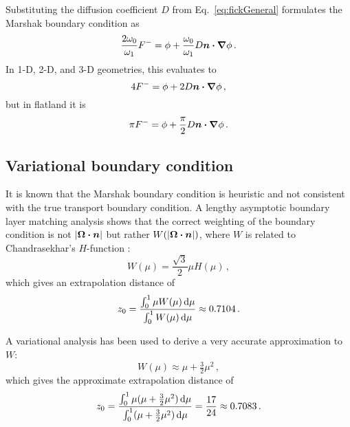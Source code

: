 Substituting the diffusion coefficient $D$ from Eq.~\eqref{eq:fickGeneral}
formulates the Marshak boundary condition as
\begin{equation*}
\frac{2\omega_0}{\omega_1} F^{-}
= \phi + \frac{\omega_0}{\omega_1} D \bm{n} \bm{\cdot} \bm{\nabla} \phi\,.
\end{equation*}
In 1-D, 2-D, and 3-D geometries, this evaluates to
\begin{equation*}
4 F^{-}
= \phi + 2 D \bm{n} \bm{\cdot} \bm{\nabla} \phi\,,
\end{equation*}
but in flatland it is
\begin{equation}\label{eq:flatlandDiffusionMarshak}
\pi F^{-}
= \phi + \frac{\pi}{2} D \bm{n} \bm{\cdot} \bm{\nabla} \phi\,.
\end{equation}

\subsection{Variational boundary condition} \label{sec:varBndy}
It is known that the Marshak boundary condition is heuristic and not consistent with the
true transport boundary condition. A lengthy asymptotic boundary layer
matching analysis \cite{Hab1975} shows that the correct weighting of the
boundary condition is not $\left| \bm{\Omega}\bm{\cdot}\bm{n} \right|$ but rather
$W(\left| \bm{\Omega}\bm{\cdot}\bm{n} \right|)$, where $W$ is related to Chandrasekhar's
$H$-function \cite{Cha1960}:
\begin{equation} \label{eq:chandraW}
  W(\mu) = \frac{\sqrt{3}}{2} \mu H(\mu) \,,
\end{equation}
which gives an extrapolation distance of
\begin{align*}
  z_0 = \frac{\int_{0}^{1} \mu W(\mu) \mathop{}\!\mathrm{d} \mu}{\int_{0}^{1} W(\mu) \mathop{}\!\mathrm{d}
  \mu} \approx 0.7104\,.
\end{align*}

A variational analysis \cite{Mal1991} has been used to
derive a very accurate approximation to $W$:
\begin{equation*}
W(\mu) \approx \mu + \tfrac{3}{2} \mu^2 \,,
\end{equation*}
which gives the approximate extrapolation distance of
\begin{equation*}
  z_0 = \frac{\int_{0}^{1} \mu (\mu + \tfrac{3}{2} \mu^2 ) \mathop{}\!\mathrm{d}
  \mu}{\int_{0}^{1} (\mu + \tfrac{3}{2} \mu^2 ) \mathop{}\!\mathrm{d} \mu} 
  = \frac{17}{24} \approx 0.7083 \,.
\end{equation*}


